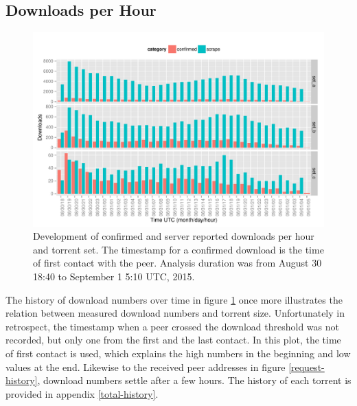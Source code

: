 \documentclass[10pt, a4paper, twoside=false, headsepline]{scrbook}
\renewcommand{\_}{\origunderscore\allowbreak}
\newcommand{\range}{from August 30 18:40 to September 1 5:10 UTC, 2015}
\begin{document}
\subsection{Downloads per Hour}
\begin{figure}
\centering
\includegraphics[width=\textwidth]{../result/2015-08-30_20-combined_download_set}
\caption[Development of confirmed and reported downloads]{Development of confirmed and server reported downloads per hour and torrent set. The timestamp for a confirmed download is the time of first contact with the peer. Analysis duration was \range.}
\label{download-history}
\end{figure}

The history of download numbers over time in figure \ref{download-history} once more illustrates the relation between measured download numbers and torrent size. Unfortunately in retrospect, the timestamp when a peer crossed the download threshold was not recorded, but only one from the first and the last contact. In this plot, the time of first contact is used, which explains the high numbers in the beginning and low values at the end. Likewise to the received peer addresses in figure \ref{request-history}, download numbers settle after a few hours. The history of each torrent is provided in appendix \ref{total-history}.
\end{document}
